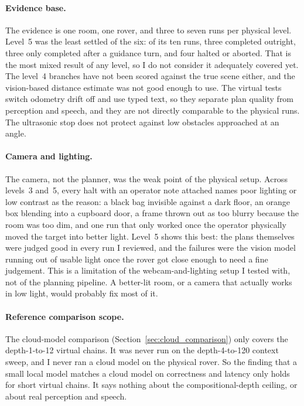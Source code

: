 \label{sec:limitations}

\paragraph{Evidence base.} The evidence is one room, one rover, and three to
seven runs per physical level. Level~5 was the least settled of the six: of
its ten runs, three completed outright, three only completed after a guidance
turn, and four halted or aborted. That is the most mixed result of any level,
so I do not consider it adequately covered yet. The level~4 branches have not
been scored against the true scene either, and the vision-based distance
estimate was not good enough to use. The virtual tests switch odometry drift
off and use typed text, so they separate plan quality from perception and
speech, and they are not directly comparable to the physical runs. The
ultrasonic stop does not protect against low obstacles approached at an
angle.

\paragraph{Camera and lighting.} The camera, not the planner, was the weak
point of the physical setup. Across levels~3 and~5, every halt with an
operator note attached names poor lighting or low contrast as the reason: a
black bag invisible against a dark floor, an orange box blending into a
cupboard door, a frame thrown out as too blurry because the room was too dim,
and one run that only worked once the operator physically moved the target
into better light. Level~5 shows this best: the plans themselves were judged
good in every run I reviewed, and the failures were the vision model running
out of usable light once the rover got close enough to need a fine judgement.
This is a limitation of the webcam-and-lighting setup I tested with, not of
the planning pipeline. A better-lit room, or a camera that actually works in
low light, would probably fix most of it.

\paragraph{Reference comparison scope.} The cloud-model comparison
(Section~\ref{sec:cloud_comparison}) only covers the depth-1-to-12 virtual
chains. It was never run on the depth-4-to-120 context sweep, and I never ran
a cloud model on the physical rover. So the finding that a small local model
matches a cloud model on correctness and latency only holds for short virtual
chains. It says nothing about the compositional-depth ceiling, or about real
perception and speech.

